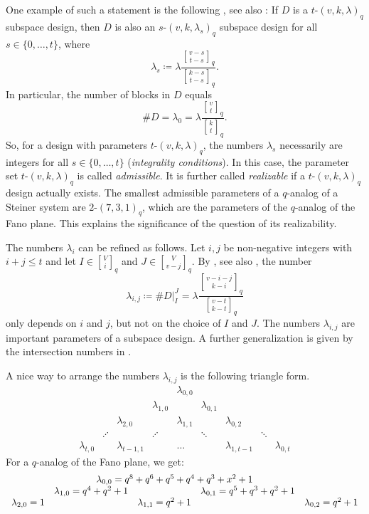 \documentclass[a4paper,abstracton,12pt]{scrartcl}
\newcommand{\qbinom}[3]{\genfrac{[}{]}{0pt}{}{#1}{#2}_{#3}}
\theoremstyle{definition}
\theoremstyle{remark}
\begin{document}
One example of such a statement is the following \cite[Lemma~4.1(1)]{Suzuki-1990-EuJC11[6]:601-607}, see also \cite[Lemma~3.6]{Kiermaier-Laue-2015-AiMoC9[1]:105-115}:
If $D$ is a $t$-$(v, k, \lambda)_q$ subspace design, then $D$ is also an $s$-$(v,k,\lambda_s)_q$ subspace design for all $s\in\{0,\ldots,t\}$, where
\[
	\lambda_s \coloneqq \lambda \frac{\qbinom{v-s}{t-s}{q}}{\qbinom{k-s}{t-s}{q}}.
\]
In particular, the number of blocks in $D$ equals
\[
\#D = \lambda_0 = \lambda \frac{\qbinom{v}{t}{q}}{\qbinom{k}{t}{q}}.
\]
So, for a design with parameters $t$-$(v, k, \lambda)_q$, the numbers $\lambda_s$ necessarily are integers for all $s\in\{0,\ldots,t\}$ (\emph{integrality conditions}).
In this case, the parameter set $t$-$(v,k,\lambda)_q$ is called \emph{admissible}.
It is further called \emph{realizable} if a $t$-$(v,k,\lambda)_q$ design actually exists.
The smallest admissible parameters of a $q$-analog of a Steiner system are $2$-$(7,3,1)_q$, which are the parameters of the $q$-analog of the Fano plane.
This explains the significance of the question of its realizability.

The numbers $\lambda_i$ can be refined as follows.
Let $i,j$ be non-negative integers with $i + j \leq t$ and let $I\in\qbinom{V}{i}{q}$ and $J\in\qbinom{V}{v-j}{q}$.
By \cite[Lemma~4.1]{Suzuki-1990-EuJC11[6]:601-607}, see also \cite[Lemma 5]{Braun-Kiermaier-Wassermann-2018-COST1}, the number
\[
	\lambda_{i,j} \coloneqq \# D|_I^J = \lambda\frac{\qbinom{v-i-j}{k-i}{q}}{\qbinom{v-t}{k-t}{q}}
\]
only depends on $i$ and $j$, but not on the choice of $I$ and $J$.
The numbers $\lambda_{i,j}$ are important parameters of a subspace design.
A further generalization is given by the intersection numbers in \cite{Kiermaier-Pavcevic-2015-JCD23[11]:463-480}.

A nice way to arrange the numbers $\lambda_{i,j}$ is the following triangle form.
\[
	\begin{array}{cccccccccc}
	& & & & \lambda_{0,0} \\
	& & & \lambda_{1,0} & & \lambda_{0,1} \\
	& & \lambda_{2,0} & & \lambda_{1,1} & & \lambda_{0,2} \\
	&\iddots & & \iddots & & \ddots & & \ddots \\
	\lambda_{t,0} & & \lambda_{t-1,1} & & \hdots & & \lambda_{1,t-1} & & \lambda_{0,t}
	\end{array}
\]
For a $q$-analog of the Fano plane, we get:
\begin{align*}
	\begin{array}{ccccc}
	& \multicolumn{3}{c}{\lambda_{0,0} = q^8 + q^6 + q^5 + q^4 + q^3 + x^2 + 1} \\
	& \lambda_{1,0} = q^4 + q^2 + 1 & & \lambda_{0,1} = q^5 + q^3 + q^2 + 1 \\
	\lambda_{2,0} = 1 & & \lambda_{1,1} = q^2 + 1 & & \lambda_{0,2} = q^2 + 1 \\
	\end{array}
\end{align*}
\end{document}
